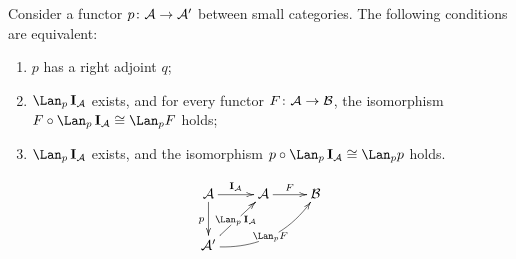   \begin{prop}
    Consider a functor $p\colon{\cal A}\to{\cal A}'$ between small categories. The following conditions are equivalent:
    \begin{enumerate}
      \item $p$ has a right adjoint $q$;
      \item $\Lan_p\Id_{\Aa}$ exists, and for every functor $F\colon{\cal A}\to{\cal B}$, the isomorphism $F\circ\Lan_p\Id_{\Aa}\cong\Lan_pF$ holds;
      \item $\Lan_p\Id_{\Aa}$ exists, and the isomorphism $p\circ\Lan_p\Id_{\Aa}\cong\Lan_pp$ holds.
    \end{enumerate}
      \begin{displaymath}
        \xymatrix{
          \Aa\ar[d]_p\ar[r]^{\Id_{\Aa}}&\Aa\ar[r]^{F}&\Bb\\
          \Aa'\ar[ur]|{\Lan_p\Id_{\Aa}}\ar@/_1.1pc/[urr]|{\Lan_pF}
         }
      \end{displaymath}
  \end{prop}
